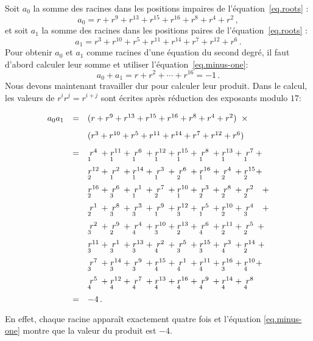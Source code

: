 Soit $a_0$ la somme des racines dans les positions impaires de l'équation~\ref{eq.roots} :
\[
a_0=r + r^9 + r^{13} +r^{15} +r^{16} + r^8+r^4+r^2\,,
\]
et soit $a_1$ la somme des racines dans les positions paires de l'équation~\ref{eq.roots} :
\[
a_1=r^3 + r^{10} + r^{5} +r^{11} +r^{14} + r^7+r^{12}+r^6\,.
\]
Pour obtenir $a_0$ et $a_1$ comme racines d'une équation du second degré, il faut d'abord calculer leur somme et utiliser l'équation~\ref{eq.minus-one}:
\[
a_0+a_1=r + r^2 + \cdots +r^{16}=-1\,.
\]
Nous devons maintenant travailler  dur pour calculer leur produit. Dans le calcul, les valeurs de $r^ir^j=r^{i+j}$ sont écrites après réduction des exposants modulo $17$:
\[
\renewcommand{\arraystretch}{1.7}
\begin{array}{lcl}
a_0a_1&=&(r + r^9 + r^{13} +r^{15} +r^{16} + r^8+r^4+r^2)\;\;\times\\
&&(r^3 + r^{10} + r^{5} +r^{11} +r^{14} + r^7+r^{12}+r^6)\\
&=&\occ{4}{1} + \occ{11}{1} + \occ{6}{1} + \occ{12}{1} + \occ{15}{1} + \occ{8}{1} + \occ{13}{1} + \occ{7}{1} +\\
&&\occ{12}{2} + \occ{2}{1} + \occ{14}{1} + \occ{3}{1} + \occ{6}{2} + \occ{16}{1} + \occ{4}{2} + \occ{15}{2} +\\
&&\occ{16}{2} + \occ{6}{3} + \occ{1}{1} + \occ{7}{2} + \occ{10}{1} + \occ{3}{2} + \occ{8}{2} + \occ{2}{2}\;\;\: +\\
&&\occ{1}{2} + \occ{8}{3} + \occ{3}{3} + \occ{9}{1} + \occ{12}{3} + \occ{5}{1} + \occ{10}{2} + \occ{4}{3}\;\;\: +\\
&&\occ{2}{3} + \occ{9}{2} + \occ{4}{4} + \occ{10}{3} + \occ{13}{2} + \occ{6}{4} + \occ{11}{2} + \occ{5}{2} \:+\\
&&\occ{11}{3} + \occ{1}{3} + \occ{13}{3} + \occ{2}{4} + \occ{5}{3} + \occ{15}{3} + \occ{3}{4} + \occ{14}{2} \;+\\
&&\occ{7}{3} + \occ{14}{3} + \occ{9}{3} + \occ{15}{4} + \occ{1}{4} + \occ{11}{4} + \occ{16}{3} + \occ{10}{4} +\\
&&\occ{5}{4} + \occ{12}{4} + \occ{7}{4} + \occ{13}{4} + \occ{16}{4} + \occ{9}{4} + \occ{14}{4} + \occ{8}{4}\\
&=&-4\,.
\end{array}
\]
En effet, chaque racine apparaît exactement quatre fois et  l'équation \ref{eq.minus-one} montre que la valeur du produit est $-4$.


